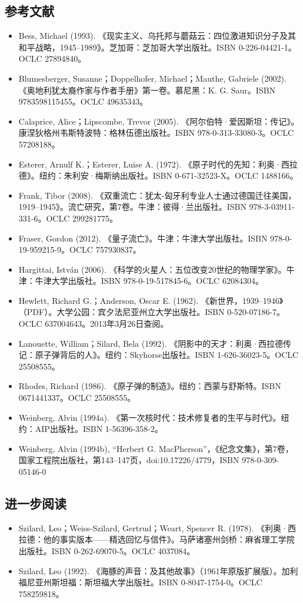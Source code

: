 \subsection{参考文献}  
\begin{itemize}
\item Bess, Michael (1993). 《现实主义、乌托邦与蘑菇云：四位激进知识分子及其和平战略，1945–1989》。芝加哥：芝加哥大学出版社。ISBN 0-226-04421-1。OCLC 27894840。  
\item Blumesberger, Susanne；Doppelhofer, Michael；Mauthe, Gabriele (2002). 《奥地利犹太裔作家与作者手册》第一卷。慕尼黑：K. G. Saur。ISBN 9783598115455。OCLC 49635343。  
\item Calaprice, Alice；Lipscombe, Trevor (2005). 《阿尔伯特·爱因斯坦：传记》。康涅狄格州韦斯特波特：格林伍德出版社。ISBN 978-0-313-33080-3。OCLC 57208188。  
\item Esterer, Arnulf K.；Esterer, Luise A. (1972). 《原子时代的先知：利奥·西拉德》。纽约：朱利安·梅斯纳出版社。ISBN 0-671-32523-X。OCLC 1488166。  
\item Frank, Tibor (2008). 《双重流亡：犹太-匈牙利专业人士通过德国迁往美国，1919–1945》。流亡研究，第7卷。牛津：彼得·兰出版社。ISBN 978-3-03911-331-6。OCLC 299281775。  
\item Fraser, Gordon (2012). 《量子流亡》。牛津：牛津大学出版社。ISBN 978-0-19-959215-9。OCLC 757930837。  
\item Hargittai, István (2006). 《科学的火星人：五位改变20世纪的物理学家》。牛津：牛津大学出版社。ISBN 978-0-19-517845-6。OCLC 62084304。  
\item Hewlett, Richard G.；Anderson, Oscar E. (1962). 《新世界，1939–1946》（PDF）。大学公园：宾夕法尼亚州立大学出版社。ISBN 0-520-07186-7。OCLC 637004643。2013年3月26日查阅。  
\item Lanouette, William；Silard, Bela (1992). 《阴影中的天才：利奥·西拉德传记：原子弹背后的人》。纽约：Skyhorse出版社。ISBN 1-626-36023-5。OCLC 25508555。  
\item Rhodes, Richard (1986). 《原子弹的制造》。纽约：西蒙与舒斯特。ISBN 0671441337。OCLC 25508555。  
\item Weinberg, Alvin (1994a). 《第一次核时代：技术修复者的生平与时代》。纽约：AIP出版社。ISBN 1-56396-358-2。  
\item Weinberg, Alvin (1994b), “Herbert G. MacPherson”，《纪念文集》，第7卷，国家工程院出版社，第143–147页，doi:10.17226/4779，ISBN 978-0-309-05146-0
\end{itemize}
\subsection{进一步阅读}  
\begin{itemize}
\item Szilard, Leo；Weiss-Szilard, Gertrud；Weart, Spencer R. (1978). 《利奥·西拉德：他的事实版本——精选回忆与信件》。马萨诸塞州剑桥：麻省理工学院出版社。ISBN 0-262-69070-5。OCLC 4037084。  
\item Szilard, Leo (1992). 《海豚的声音：及其他故事》（1961年原版扩展版）。加利福尼亚州斯坦福：斯坦福大学出版社。ISBN 0-8047-1754-0。OCLC 758259818。
\end{itemize}
